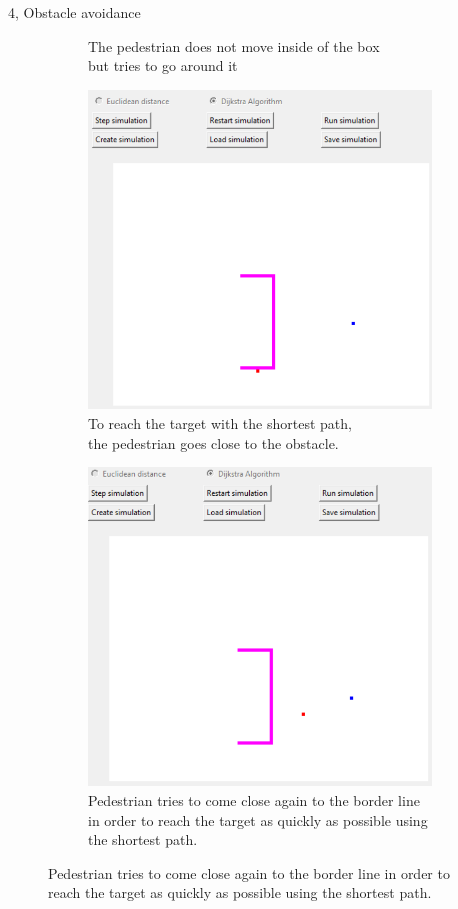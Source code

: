 \documentclass[10pt,a4paper]{article}
\begin{document}
\begin{task}{4, Obstacle avoidance}
\begin{figure}[H]
\begin{subfigure}[t]{0.5\textwidth}
        \caption{The pedestrian does not move inside of the box \\ but tries to go around it}
    \end{subfigure}
    \begin{subfigure}[t]{0.5\textwidth}
        \includegraphics[width=0.9\linewidth]{images/task4_dij_chicken_mid.png}
        \caption{To reach the target with the shortest path, \\ the pedestrian goes close to the obstacle.}
    \end{subfigure}
    \begin{subfigure}[t]{0.5\textwidth}
        \includegraphics[width=0.9\linewidth]{images/task4_dij_chicken_end.png}
        \caption{Pedestrian tries to come close again to the border line in order to reach the target as quickly as possible using the shortest path.  }
    \end{subfigure}







\end{figure}
\end{task}
\end{document}
